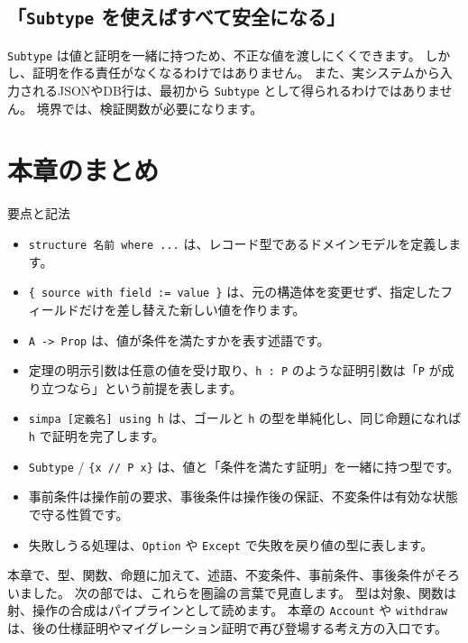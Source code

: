 \subsection{「\texttt{Subtype} を使えばすべて安全になる」}

\texttt{Subtype} は値と証明を一緒に持つため、不正な値を渡しにくくできます。
しかし、証明を作る責任がなくなるわけではありません。
また、実システムから入力されるJSONやDB行は、最初から \texttt{Subtype} として得られるわけではありません。
境界では、検証関数が必要になります。

\section{本章のまとめ}

要点と記法
\begin{itemize}
\item \texttt{structure 名前 where ...} は、レコード型であるドメインモデルを定義します。
\item \texttt{\{ source with field := value \}} は、元の構造体を変更せず、指定したフィールドだけを差し替えた新しい値を作ります。
\item \texttt{A -> Prop} は、値が条件を満たすかを表す述語です。
\item 定理の明示引数は任意の値を受け取り、\texttt{h : P} のような証明引数は「\texttt{P} が成り立つなら」という前提を表します。
\item \texttt{simpa [定義名] using h} は、ゴールと \texttt{h} の型を単純化し、同じ命題になれば \texttt{h} で証明を完了します。
\item \texttt{Subtype} / \texttt{\{x // P x\}} は、値と「条件を満たす証明」を一緒に持つ型です。
\item 事前条件は操作前の要求、事後条件は操作後の保証、不変条件は有効な状態で守る性質です。
\item 失敗しうる処理は、\texttt{Option} や \texttt{Except} で失敗を戻り値の型に表します。
\end{itemize}

本章で、型、関数、命題に加えて、述語、不変条件、事前条件、事後条件がそろいました。
次の部では、これらを圏論の言葉で見直します。
型は対象、関数は射、操作の合成はパイプラインとして読めます。
本章の \texttt{Account} や \texttt{withdraw} は、後の仕様証明やマイグレーション証明で再び登場する考え方の入口です。
